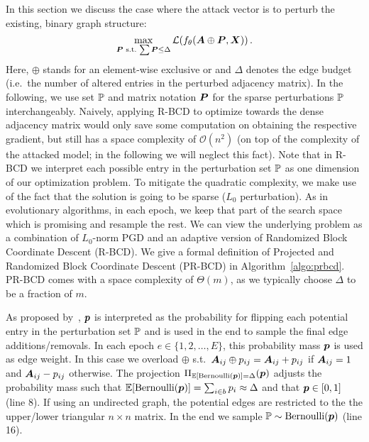 \documentclass[sigconf,authordraft]{acmart}
\newcommand{\adj}{\mA}
\newcommand{\features}{\mX}
\begin{document}
In this section we discuss the case where the attack vector is to perturb the existing, binary graph structure:
%
\begin{equation}\label{eq:pgd}
  \max_{\mP\,\,\text{s.t.}\, \sum \mP \le \Delta} \mathcal{L}(f_{\theta}(\adj \oplus \mP, \features))\,.
\end{equation}
%
Here, \(\oplus\) stands for an element-wise exclusive or and \(\Delta\) denotes the edge budget (i.e.\ the number of altered entries in the perturbed adjacency matrix). In the following, we use set \({\mathbb{P}}\) and matrix notation \({\bm{P}}\) for the sparse perturbations \({\mathbb{P}}\) interchangeably. Naively, applying R-BCD to optimize towards the dense adjacency matrix would only save some computation on obtaining the respective gradient, but still has a space complexity of \(\mathcal{O}(n^2)\) (on top of the complexity of the attacked model; in the following we will neglect this fact). Note that in R-BCD we interpret each possible entry in the perturbation set \({\mathbb{P}}\) as one dimension of our optimization problem. To mitigate the quadratic complexity, we make use of the fact that the solution is going to be sparse (\(L_0\) perturbation). As in evolutionary algorithms, in each epoch, we keep that part of the search space which is promising and resample the rest. We can view the underlying problem as a combination of \(L_0\)-norm PGD and an adaptive version of Randomized Block Coordinate Descent (R-BCD). We give a formal definition of Projected and Randomized Block Coordinate Descent (PR-BCD) in Algorithm~\ref{algo:prbcd}. PR-BCD comes with a space complexity of \(\Theta(m)\), as we typically choose \(\Delta\) to be a fraction of \(m\).

As proposed by~\citet{Xu2019a}, \({\bm{p}}\) is interpreted as the probability for flipping each potential entry in the perturbation set \({\mathbb{P}}\) and is used in the end to sample the final edge additions/removals. In each epoch \(e \in \{1,2, \dots, E\}\), this probability mass \({\bm{p}}\) is used as edge weight. In this case we overload \(\oplus\) s.t.\ \(\adj_{ij} \oplus p_{ij} = \adj_{ij} + p_{ij}\) if \(\adj_{ij} = 1\) and \(\adj_{ij} - p_{ij}\) otherwise. The projection \(\Pi_{\mathbb{E}[\text{Bernoulli}({\bm{p}})] = \Delta} ({\bm{p}})\) adjusts the probability mass such that \(\mathbb{E}[\text{Bernoulli}({\bm{p}})] = \sum_{i \in b} {p}_i \approx \Delta\) and that \({\bm{p}} \in [0, 1]\) (line 8). If using an undirected graph, the potential edges are restricted to the the upper/lower triangular \(n \times n\) matrix. In the end we sample \({\mathbb{P}} \sim \text{Bernoulli}({\bm{p}})\) (line 16).
\end{document}
